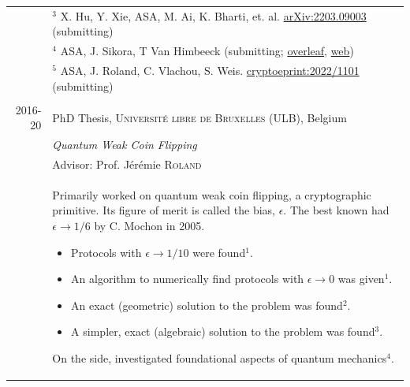 \documentclass[a4paper,10pt]{article}
\begin{document}
\begin{longtable}{r|p{11cm}}
                    &\small{{\tiny $^3$} X. Hu, Y. Xie, ASA, M. Ai, K. Bharti, et. al. \href{https://arxiv.org/abs/2203.09003}{arXiv:2203.09003} (submitting)}\\  
                    &\small{{\tiny $^4$} ASA, J. Sikora, T Van Himbeeck (submitting; \href{https://www.overleaf.com/read/jhwnvgbntqkd}{overleaf}, \href{http://atulsingharora.github.io/DI_WCF}{web})}\\
                    &\small{{\tiny $^5$} ASA, J. Roland, C. Vlachou, S. Weis. \href{https://eprint.iacr.org/2022/1101}{cryptoeprint:2022/1101} (submitting)}\\
  \multicolumn{2}{c}{} \\                   
 \textsc{2016-20}     & PhD Thesis, \textsc{Université libre de Bruxelles (ULB)}, Belgium \\
                    &\emph{Quantum Weak Coin Flipping} \\
                    &\small Advisor: Prof. Jérémie \textsc{Roland}\\
                    &\footnotesize{Primarily worked on quantum weak coin flipping, a cryptographic primitive. Its figure of merit is called the bias, $\epsilon$. The best known had $\epsilon \to 1/6$ by C. Mochon in 2005.
                    \begin{itemize}[leftmargin=8pt]
                      \item[] Protocols with $\epsilon \to 1/10$ were found{\tiny $^1$}.
                      \item[] An algorithm to numerically find protocols with $\epsilon\to 0$ was given{\tiny $^1$}.
                      \item[] An exact (geometric) solution to the problem was found{\tiny $^2$}. 
                      \item[] A simpler, exact (algebraic) solution to the problem was found{\tiny $^3$}.
                    \end{itemize}
                    On the side, investigated foundational aspects of quantum mechanics{\tiny $^4$}. 
                    } \\

\end{longtable}
\end{document}
